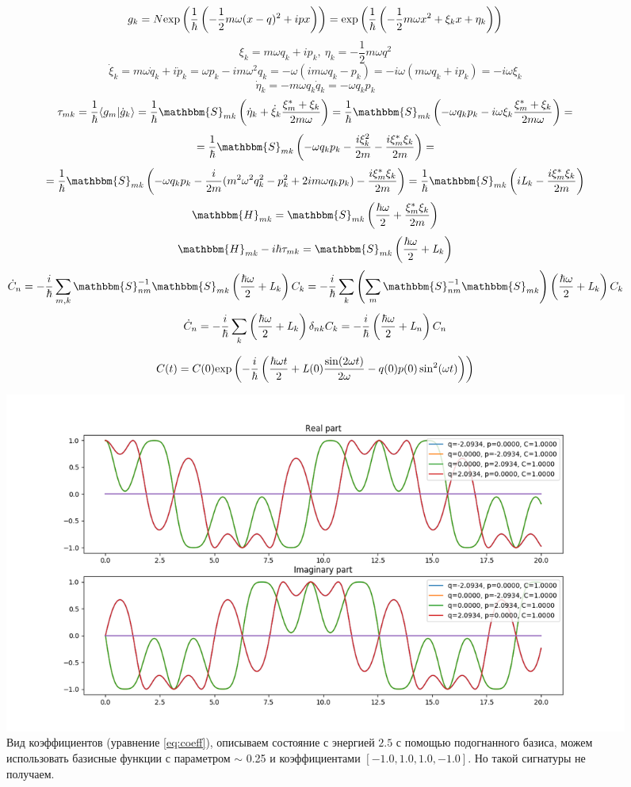 $$g_k=N\myexp{\frac{1}{\hbar}\left(-\frac{1}{2}m\omega(x-q)^2+ipx\right)}=%
       \myexp{\frac{1}{\hbar}\left(-\frac{1}{2}m\omega x^2 + \xi_kx + \eta_k\right)}$$
$$\xi_k=m\omega q_k+ip_k,\ \eta_k=-\frac{1}{2}m\omega q^2$$
$$\dot{\xi}_k=m\omega\dot{q}_k+i\dot{p}_k=\omega p_k-im\omega^2q_k=-\omega(im\omega q_k - p_k)=-i\omega(m\omega q_k+ip_k)=-i\omega\xi_k$$
$$\dot{\eta}_k=-m\omega q_k\dot{q}_k=-\omega q_kp_k$$
$$\tau_{mk}=\frac{1}{\hbar}\myint{g_m}{\dot{g}_k}=%
				   \frac{1}{\hbar}\mathbbm{S}_{mk}\left(\dot{\eta}_k+\dot{\xi}_k\frac{\xi_m^*+\xi_k}{2m\omega}\right)=%
				   \frac{1}{\hbar}\mathbbm{S}_{mk}\left(-\omega q_kp_k-i\omega\xi_k\frac{\xi_m^*+\xi_k}{2m\omega}\right)=$$
$$=\frac{1}{\hbar}\mathbbm{S}_{mk}\left(-\omega q_kp_k-\frac{i\xi_k^2}{2m}-\frac{i\xi_m^*\xi_k}{2m}\right)=$$
$$=\frac{1}{\hbar}\mathbbm{S}_{mk}\left(-\omega q_kp_k-\frac{i}{2m}(m^2\omega^2q_k^2-p_k^2+2im\omega q_kp_k)-%
					 \frac{i\xi_m^*\xi_k}{2m}\right)=%
\frac{1}{\hbar}\mathbbm{S}_{mk}\left(i\myl_k-\frac{i\xi_m^*\xi_k}{2m}\right)$$
$$\mathbbm{H}_{mk}=\mathbbm{S}_{mk}\left(\frac{\hbar\omega}{2}+\frac{\xi_m^*\xi_k}{2m}\right)$$
$$\mathbbm{H}_{mk}-i\hbar\tau_{mk}=\mathbbm{S}_{mk}\left(\frac{\hbar\omega}{2}+\myl_k\right)$$
$$\dot{C}_n=-\frac{i}{\hbar}\sum_{m,k}\mathbbm{S}_{nm}^{-1}\mathbbm{S}_{mk}\left(\frac{\hbar\omega}{2}+\myl_k\right)C_k=%
	    -\frac{i}{\hbar}\sum_k\left(\sum_m\mathbbm{S}_{nm}^{-1}\mathbbm{S}_{mk}\right)%
				  \left(\frac{\hbar\omega}{2}+\myl_k\right)C_k$$
$$\dot{C}_n=-\frac{i}{\hbar}\sum_k\left(\frac{\hbar\omega}{2}+\myl_k\right)\delta_{nk}C_k=%
	    -\frac{i}{\hbar}\left(\frac{\hbar\omega}{2}+\myl_n\right)C_n$$

\begin{equation}
C(t)=C(0)\text{exp}\left( -\frac{i}{\hbar}\left(\frac{\hbar\omega t}{2}+\mathit{L}(0)\frac{\sin(2\omega t)}{2\omega}-q(0)p(0)\sin^2(\omega t)\right) \right)
\label{eq:coeff}
\end{equation}
\begin{figure}[H]
\includegraphics[scale=0.5]{eq_coeff_1.png}
\caption{Вид коэффициентов (уравнение \ref{eq:coeff}), описываем состояние с энергией $2.5$ с помощью подогнанного базиса, %
	 можем использовать базисные функции с параметром $\sim$ 0.25 и коэффициентами $[-1.0, 1.0, 1.0, -1.0]$. %
	 Но такой сигнатуры не получаем. }
\end{figure}

